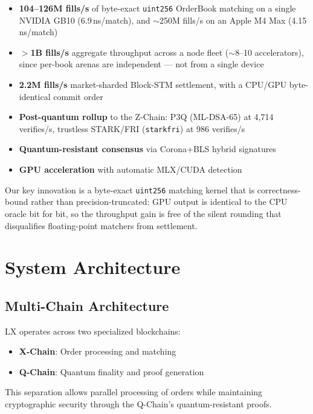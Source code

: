 \documentclass[11pt,a4paper]{article}
\newcommand{\lxdex}{\textsc{LX}}
\begin{document}
\begin{itemize}
    \item \textbf{104--126M fills/s} of byte-exact \texttt{uint256} OrderBook matching on a single NVIDIA GB10 (6.9\,ns/match), and $\sim$250M fills/s on an Apple M4 Max (4.15\,ns/match)
    \item \textbf{$>$1B fills/s} aggregate throughput across a node fleet ($\sim$8--10 accelerators), since per-book arenas are independent --- not from a single device
    \item \textbf{2.2M fills/s} market-sharded Block-STM settlement, with a CPU/GPU byte-identical commit order
    \item \textbf{Post-quantum rollup} to the Z-Chain: P3Q (ML-DSA-65) at 4{,}714 verifies/s, trustless STARK/FRI (\texttt{starkfri}) at 986 verifies/s
    \item \textbf{Quantum-resistant consensus} via Corona+BLS hybrid signatures
    \item \textbf{GPU acceleration} with automatic MLX/CUDA detection
\end{itemize}

Our key innovation is a byte-exact \texttt{uint256} matching kernel that is
correctness-bound rather than precision-truncated: GPU output is identical to
the CPU oracle bit for bit, so the throughput gain is free of the silent
rounding that disqualifies floating-point matchers from settlement.

\section{System Architecture}

\subsection{Multi-Chain Architecture}

\lxdex{} operates across two specialized blockchains:

\begin{itemize}
    \item \textbf{X-Chain}: Order processing and matching
    \item \textbf{Q-Chain}: Quantum finality and proof generation
\end{itemize}

This separation allows parallel processing of orders while maintaining cryptographic security through the Q-Chain's quantum-resistant proofs.
\end{document}
